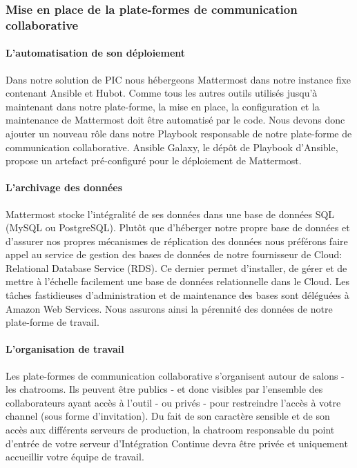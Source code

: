         \subsubsection{Mise en place de la plate-formes de communication collaborative}

          \paragraph{L'automatisation de son déploiement}
          Dans notre solution de PIC nous hébergeons Mattermost dans notre instance fixe contenant Ansible et Hubot. Comme tous les autres outils utilisés jusqu'à maintenant dans notre plate-forme, la mise en place, la configuration et la maintenance de Mattermost doit être automatisé par le code. Nous devons donc ajouter un nouveau rôle dans notre Playbook responsable de notre plate-forme de communication collaborative. Ansible Galaxy, le dépôt de Playbook d'Ansible, propose un artefact pré-configuré pour le déploiement de Mattermost.

          \paragraph{L'archivage des données}
          Mattermost stocke l'intégralité de ses données dans une base de données SQL (MySQL ou PostgreSQL). Plutôt que d'héberger notre propre base de données et d'assurer nos propres mécanismes de réplication des données nous préférons faire appel au service de gestion des bases de données de notre fournisseur de Cloud: Relational Database Service (RDS). Ce dernier permet d'installer, de gérer et de mettre à l'échelle facilement une base de données relationnelle dans le Cloud. Les tâches fastidieuses d'administration et de maintenance des bases sont déléguées à Amazon Web Services. Nous assurons ainsi la pérennité des données de notre plate-forme de travail.

          \paragraph{L'organisation de travail}
          Les plate-formes de communication collaborative s'organisent autour de salons - les chatrooms. Ils peuvent être publics - et donc visibles par l'ensemble des collaborateurs ayant accès à l'outil - ou privés - pour restreindre l'accès à votre channel (sous forme d'invitation). Du fait de son caractère sensible et de son accès aux différents serveurs de production, la chatroom responsable du point d'entrée de votre serveur d'Intégration Continue devra être privée et uniquement accueillir votre équipe de travail.

